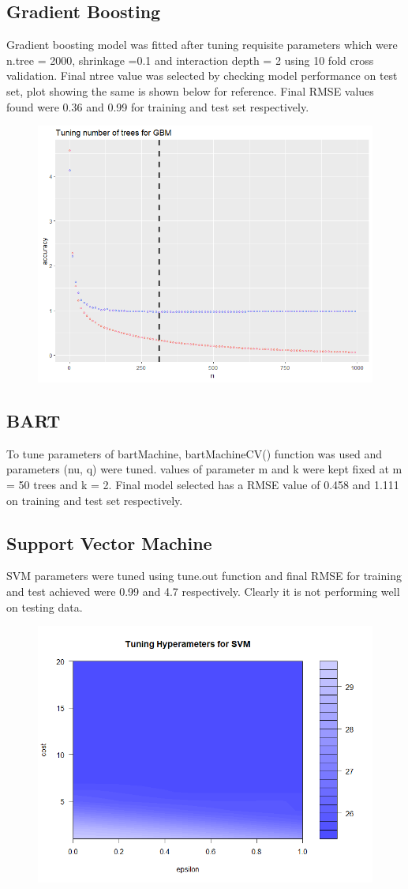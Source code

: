 \documentclass[letterpaper,12pt]{article}
\begin{document}
\subsection{Gradient Boosting}
Gradient boosting model was fitted after tuning requisite parameters which were n.tree = 2000, shrinkage =0.1 and interaction depth = 2 using 10 fold cross validation. Final ntree value was selected by checking model performance on test set, plot showing the same is shown below for reference. Final RMSE values found were 0.36 and 0.99 for training and test set respectively.
\begin{figure}[H] 
        \centering \includegraphics[width=0.65\columnwidth]{gbmntree.png}
\end{figure}

\subsection{BART}
To tune parameters of bartMachine, bartMachineCV() function was used and parameters (nu, q) were tuned. values of parameter m and k were kept fixed at m = 50 trees and k = 2. Final model selected has a RMSE value of 0.458 and 1.111 on training and test set respectively.

\subsection{Support Vector Machine}
SVM parameters were tuned using tune.out function and final RMSE for training and test achieved were 0.99 and 4.7 respectively. Clearly it is not performing well on testing data.
\begin{figure}[H] 
        \centering \includegraphics[width=0.62\columnwidth]{svm.png}
\end{figure}
\end{document}
